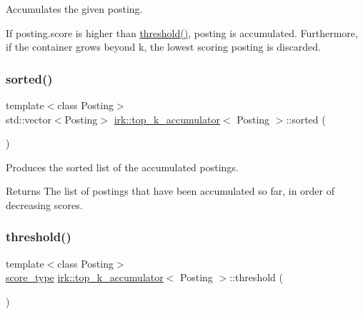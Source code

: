 Accumulates the given posting. 

If {\ttfamily posting.\+score} is higher than \mbox{\hyperlink{classirk_1_1top__k__accumulator_a97ec26c362ccb2f9c929be221eb382d6}{threshold()}}, {\ttfamily posting} is accumulated. Furthermore, if the container grows beyond {\ttfamily k}, the lowest scoring posting is discarded. \mbox{\label{classirk_1_1top__k__accumulator_ae89ee96c6485fb5369930e5a2c706aaa}} 
\subsubsection{\texorpdfstring{sorted()}{sorted()}}
{\footnotesize\ttfamily template$<$class Posting$>$ \\
std\+::vector$<$Posting$>$ \mbox{\hyperlink{classirk_1_1top__k__accumulator}{irk\+::top\+\_\+k\+\_\+accumulator}}$<$ Posting $>$\+::sorted (\begin{DoxyParamCaption}{ }\end{DoxyParamCaption})\hspace{0.3cm}{\ttfamily [inline]}}



Produces the sorted list of the accumulated postings. 

\begin{DoxyReturn}{Returns}
The list of postings that have been accumulated so far, in order of decreasing scores. 
\end{DoxyReturn}
\mbox{\label{classirk_1_1top__k__accumulator_a97ec26c362ccb2f9c929be221eb382d6}} 
\subsubsection{\texorpdfstring{threshold()}{threshold()}}
{\footnotesize\ttfamily template$<$class Posting$>$ \\
\mbox{\hyperlink{classirk_1_1top__k__accumulator_a0f5b0bb5549996794b2a06fe17c694d9}{score\+\_\+type}} \mbox{\hyperlink{classirk_1_1top__k__accumulator}{irk\+::top\+\_\+k\+\_\+accumulator}}$<$ Posting $>$\+::threshold (\begin{DoxyParamCaption}{ }\end{DoxyParamCaption})\hspace{0.3cm}{\ttfamily [inline]}}



